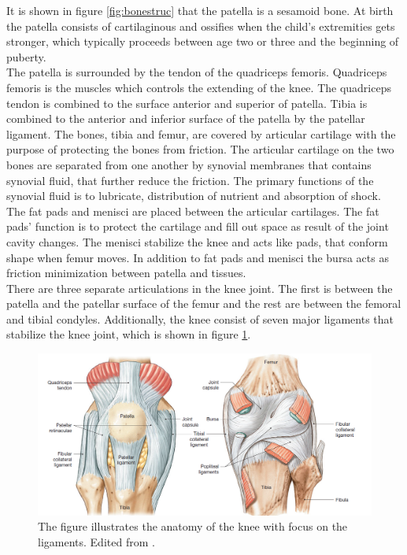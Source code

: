 \noindent
It is shown in figure \ref{fig:bonestruc} that the patella is a sesamoid bone. At birth the patella consists of cartilaginous and ossifies when the child’s extremities gets stronger, which typically proceeds between age two or three and the beginning of puberty. \\
\noindent
The patella is surrounded by the tendon of the quadriceps femoris. Quadriceps femoris is the muscles which controls the extending of the knee. The quadriceps tendon is combined to the surface anterior and superior of patella. Tibia is combined to the anterior and inferior surface of the patella by the patellar ligament. The bones, tibia and femur, are covered by articular cartilage with the purpose of protecting the bones from friction. The articular cartilage on the two bones are separated from one another by synovial membranes that contains synovial fluid, that further reduce the friction. The primary functions of the synovial fluid is to lubricate, distribution of nutrient and absorption of shock.\citep{Martini2012}\newline
\noindent
The fat pads and menisci are placed between the articular cartilages. The fat pads’ function is to protect the cartilage and fill out space as result of the joint cavity changes. The menisci stabilize the knee and acts like pads, that conform shape when femur moves. In addition to fat pads and menisci the bursa acts as friction minimization between patella and tissues.\citep{Martini2012} \\
There are three separate articulations in the knee joint. The first is between the patella and the patellar surface of the femur and the rest are between the femoral and tibial condyles. Additionally, the knee consist of seven major ligaments that stabilize the knee joint, which is shown in figure \ref{fig:knee}.\citep{Martini2012}

\begin{figure} [H]
\centering
\includegraphics[width=1\textwidth]{figures/knee}
\caption{The figure illustrates the anatomy of the knee with focus on the ligaments. Edited from \citep{Martini2012}.}
\label{fig:knee}
\end{figure}

